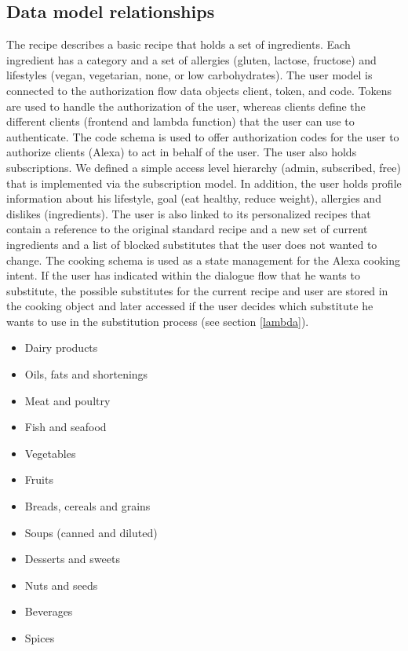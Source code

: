 \subsection*{Data model relationships}
The recipe describes a basic recipe that holds a set of ingredients. Each ingredient has a category and a set of allergies (gluten, lactose, fructose) and lifestyles (vegan, vegetarian, none, or low carbohydrates). The user model is connected to the authorization flow data objects client, token, and code. Tokens are used to handle the authorization of the user, whereas clients define the different clients (frontend and lambda function) that the user can use to authenticate. The code schema is used to offer authorization codes for the user to authorize clients (Alexa) to act in behalf of the user. The user also holds subscriptions. We defined a simple access level hierarchy (admin, subscribed, free) that is implemented via the subscription model. In addition, the user holds profile information about his lifestyle, goal (eat healthy, reduce weight), allergies and dislikes (ingredients). The user is also linked to its personalized recipes that contain a reference to the original standard recipe and a new set of current ingredients and a list of blocked substitutes that the user does not wanted to change. The cooking schema is used as a state management for the Alexa cooking intent. If the user has indicated within the dialogue flow that he wants to substitute, the possible substitutes for the current recipe and user are stored in the cooking object and later accessed if the user decides which substitute he wants to use in the substitution process (see section \ref{lambda}).

\vspace{-1em}
	\begin{itemize} 
		\itemsep-0.5em 
		\item Dairy products
		\item Oils, fats and shortenings	
		\item Meat and poultry	
		\item Fish and seafood
		\item Vegetables	
		\item Fruits	
		\item Breads, cereals and grains	
		\item Soups (canned and diluted)	
		\item Desserts and sweets	
		\item Nuts and seeds	
		\item Beverages
		\item Spices
	\end{itemize}

